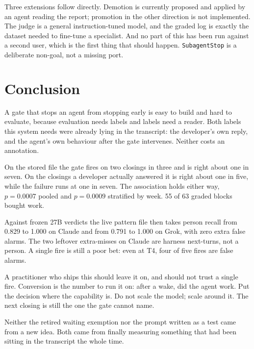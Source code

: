 Three extensions follow directly. Demotion is currently proposed and applied by
an agent reading the report; promotion in the other direction is not
implemented. The judge is a general instruction-tuned model, and the graded log
is exactly the dataset needed to fine-tune a specialist. And no part of this has
been run against a second user, which is the first thing that should happen. \texttt{SubagentStop} is a deliberate non-goal, not a missing port.

\section{Conclusion}

A gate that stops an agent from stopping early is easy to build and hard to
evaluate, because evaluation needs labels and labels need a reader. Both
labels this system needs were already lying in the transcript: the
developer's own reply, and the agent's own behaviour after the gate
intervenes. Neither costs an annotation.

On the stored file the gate fires on two closings in three and is right
about one in seven. On the closings a developer actually answered it is
right about one in five, while the failure runs at one in seven. The
association holds either way, $p = 0.0007$ pooled and $p = 0.0009$
stratified by week. 55 of 63 graded blocks bought work.

Against frozen 27B verdicts the live pattern file then takes person
recall from 0.829 to 1.000 on Claude and from 0.791 to 1.000 on Grok,
with zero extra false alarms. The two leftover extra-misses on Claude
are harness next-turns, not a person. A single fire is still a poor
bet: even at T4, four of five fires are false alarms.

A practitioner who ships this should leave it on, and should not trust a
single fire. Conversion is the number to run it on: after a wake, did
the agent work. Put the decision where the capability is. Do not scale
the model; scale around it. The next closing is still the one the gate
cannot name.

Neither the retired waiting exemption nor the prompt written as a test
came from a new idea. Both came from finally measuring something that
had been sitting in the transcript the whole time.
